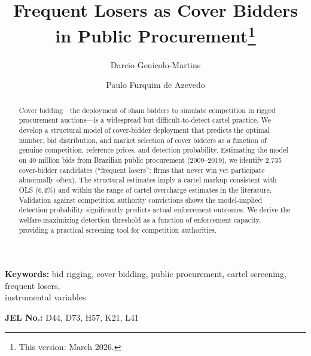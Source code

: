 \begin{frontmatter}

\title{Frequent Losers as Cover Bidders in Public Procurement\texorpdfstring{\footnote{This version: March 2026.}}{}}

\author[insper]{Darcio Genicolo-Martins}
\author[insper]{Paulo Furquim de Azevedo}

\begin{abstract} %
Cover bidding---the deployment of sham bidders to simulate competition
in rigged procurement auctions---is a widespread but difficult-to-detect
cartel practice. We develop a structural model of cover-bidder deployment
that predicts the optimal number, bid distribution, and market selection
of cover bidders as a function of genuine competition, reference prices,
and detection probability. Estimating the model on 40 million bids from
Brazilian public procurement (2009--2019), we identify 2,735
cover-bidder candidates (``frequent losers'': firms that never win yet
participate abnormally often). The structural estimates imply a cartel
markup consistent with OLS (6.4\%) and within the range of cartel
overcharge estimates in the literature. Validation against competition
authority convictions shows the model-implied detection probability
significantly predicts actual enforcement outcomes. We derive the
welfare-maximizing detection threshold as a function of enforcement
capacity, providing a practical screening tool for competition
authorities.
\end{abstract}

\end{frontmatter}

\noindent\textbf{Keywords:} bid rigging, cover bidding, public procurement, cartel screening, frequent losers,\\ instrumental variables

\noindent\textbf{JEL No.:} D44, D73, H57, K21, L41

\bigskip
